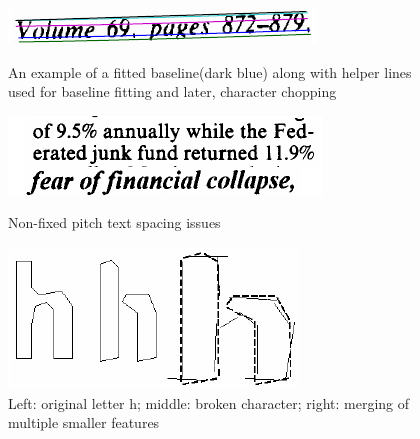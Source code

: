 \begin{figure}[t]
\minipage{\textwidth}
    \centering
    \includegraphics[width=0.7\linewidth]{img/textDetection/tesseractBaseline.png}
    \caption{An example of a fitted baseline(dark blue) along with helper lines used for baseline fitting and later, character chopping~\citep{smith2007overview}}
    \label{fig:textRecTesseractBaseline}
\endminipage\hfill
{}
    \includegraphics[width=\linewidth]{img/textDetection/tesseractSpacing.png}
    \caption{Non-fixed pitch text spacing issues~\citep{smith2007overview}}
    \label{fig:textRecTesseractSpacing}
\endminipage\hfill
{}
    \includegraphics[width=\linewidth]{img/textDetection/tesseractCharacters.png}
    \caption{Left: original letter h; middle: broken character; right: merging of multiple smaller features~\citep{smith2007overview}}
    \label{fig:textRecTesseractChars}
\endminipage
\label{fig:textRecTesseract}
\end{figure}